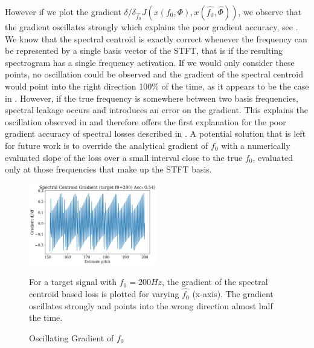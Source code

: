 \begin{theappendices}
However if we plot the gradient $\delta/\delta_{\hat{f_0}} J(x(f_0, \Phi), x(\hat{f_0}, \hat{\Phi}))$, we observe that the gradient oscillates strongly which explains the poor gradient accuracy, see .
We know that the spectral centroid is exactly correct whenever the frequency can be represented by a single basis vector of the STFT, that is if the resulting spectrogram has a single frequency activation. If we would only consider these points, no oscillation could be observed and the gradient of the spectral centroid would point into the right direction 100\% of the time, as it appears to be the case in . However, if the true frequency is somewhere between two basis frequencies, spectral leakage occurs and introduces an error on the gradient. This explains the oscillation observed in  and therefore offers the first explanation for the poor gradient accuracy of spectral losses described in \citet{turian_im_nodate}. \newline
A potential solution that is left for future work is to override the analytical gradient of $f_0$ with a numerically evaluated slope of the loss over a small interval close to the true $f_0$, evaluated only at those frequencies that make up the STFT basis.


\begin{figure}
    \centering
    \includegraphics[width=0.5\textwidth]{figures/pitch_learning/oscillation/spectral_centroid_large.png}

    \caption{Oscillating Gradient of $f_0$}
    \label{fig:oscillating-loss}
    \small{For a target signal with $f_0 = 200Hz$, the gradient of the spectral centroid based loss is plotted for varying $\hat{f_0}$ (x-axis). The gradient oscillates strongly and points into the wrong direction almost half the time.}
\end{figure}





\end{theappendices}
